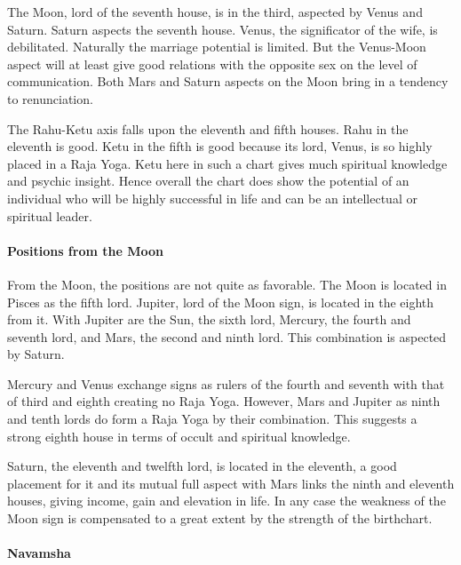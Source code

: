  

The Moon, lord of the seventh house, is in the third, aspected by Venus and Saturn. Saturn aspects the seventh house. Venus, the significator of the wife, is debilitated. Naturally the marriage potential is limited. But the Venus-Moon aspect will at least give good relations with the opposite sex on the level of communication. Both Mars and Saturn aspects on the Moon bring in a tendency to renunciation.

 

The Rahu-Ketu axis falls upon the eleventh and fifth houses. Rahu in the eleventh is good. Ketu in the fifth is good because its lord, Venus, is so highly placed in a Raja Yoga. Ketu here in such a chart gives much spiritual knowledge and psychic insight. Hence overall the chart does show the potential of an individual who will be highly successful in life and can be an intellectual or spiritual leader.

 

\paragraph{Positions from the Moon}

 

From the Moon, the positions are not quite as favorable. The Moon is located in Pisces as the fifth lord. Jupiter, lord of the Moon sign, is located in the eighth from it. With Jupiter are the Sun, the sixth lord, Mercury, the fourth and seventh lord, and Mars, the second and ninth lord. This combination is aspected by Saturn.

 

Mercury and Venus exchange signs as rulers of the fourth and seventh with that of third and eighth creating no Raja Yoga. However, Mars and Jupiter as ninth and tenth lords do form a Raja Yoga by their combination. This suggests a strong eighth house in terms of occult and spiritual knowledge.

 

Saturn, the eleventh and twelfth lord, is located in the eleventh, a good placement for it and its mutual full aspect with Mars links the ninth and eleventh houses, giving income, gain and elevation in life. In any case the weakness of the Moon sign is compensated to a great extent by the strength of the birthchart.

 

\paragraph{Navamsha}

